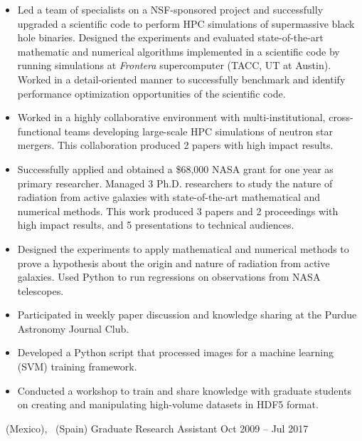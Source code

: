{%
\begin{itemize}
    \item Led a team of specialists on a NSF-sponsored project and successfully upgraded a scientific code to perform HPC simulations of supermassive black hole binaries. Designed the experiments and evaluated state-of-the-art mathematic and numerical algorithms implemented in a scientific code by running simulations at \emph{Frontera} supercomputer (TACC, UT at Austin). Worked in a detail-oriented manner to successfully benchmark and identify performance optimization opportunities of the scientific code.
    \item Worked in a highly collaborative environment with multi-institutional, cross-functional teams developing large-scale HPC simulations of neutron star mergers. This collaboration produced 2 papers with high impact results.
    \item Successfully applied and obtained a \$68,000 NASA grant for one year as primary researcher. Managed 3 Ph.D. researchers to study the nature of radiation from active galaxies with state-of-the-art mathematical and numerical methods. This work produced 3 papers and 2 proceedings with high impact results, and 5 presentations to technical audiences.
    \item Designed the experiments to apply mathematical and numerical methods to prove a hypothesis about the origin and nature of radiation from active galaxies. Used Python to run regressions on observations from NASA telescopes.
    \item Participated in weekly paper discussion and knowledge sharing at the Purdue Astronomy Journal Club.
    \item Developed a Python script that processed images for a machine learning (SVM) training framework.
    \item Conducted a workshop to train and share knowledge with graduate students on creating and manipulating high-volume datasets in HDF5 format.
\end{itemize}
}
\cventry{}%
{\UMSNH\ (Mexico), \UVval\ (Spain)}%
{Graduate Research Assistant}%
{Oct 2009 -- Jul 2017}%
{}%
